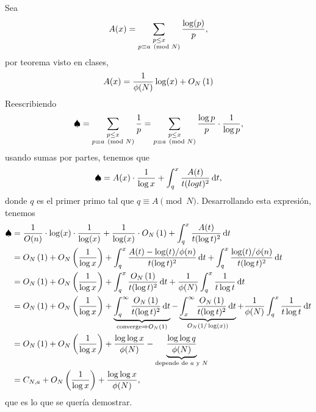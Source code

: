 \begin{sol}
	Sea
	$$A(x) = \ds\sum_{\substack{p \leq x \\ p \equiv a \pmod N}} \frac{\log (p)}{p},$$
	por teorema visto en clases,
	$$A(x) = \frac{1}{\phi(N)} \log (x) + \BigO[N]{1}$$
	Reescribiendo
	$$\spadesuit = \ds\sum_{\substack{p \leq x \\ p \equiv a \pmod N}} \frac{1}{p} = \ds\sum_{\substack{p \leq x \\ p \equiv a \pmod N}} \frac{\log p}{p} \cdot \frac{1}{\log p},$$
	usando sumas por partes, tenemos que
	$$\spadesuit = A(x) \cdot \frac{1}{\log x} + \int_q^x \frac{A(t)}{t (log t)^2} \d{t},$$
	donde $q$ es el primer primo tal que $q \equiv A \pmod N$. Desarrollando esta expresión, tenemos
	\begin{align*}
		\spadesuit & = \frac{1}{O(n)} \cdot \log (x) \cdot \frac{1}{\log (x)} + \frac{1}{\log (x)} \cdot \BigO[N]{1} + \int_q^x \frac{A(t)}{t (\log t)^2} \d{t}                                                                                                                                                             \\
		           & = \BigO[N]{1} + \BigO[N]{ \frac{1}{\log x} } + \int_q^x \frac{A(t) - \log(t)/\phi(n)}{t (\log t)^2} \d{t} + \int_q^x \frac{\log(t)/\phi(n)}{t (\log t)^2} \d{t}                                                                                                                                        \\
		           & = \BigO[N]{1} + \BigO[N]{ \frac{1}{\log x} } + \int_q^x \frac{\BigO[N]{1}}{t (\log t)^2} \d{t} + \frac{1}{\phi(N)} \int_q^x \frac{1}{t \log t} \d{t}                                                                                                                                                   \\
		           & = \BigO[N]{1} + \BigO[N]{ \frac{1}{\log x} } + \underbrace{\int_q^\infty \frac{\BigO[N]{1}}{t (\log t)^2} \d{t}}_{\text{converge} \Rightarrow \BigO[N]{1}} - \underbrace{\int_x^\infty \frac{\BigO[N]{1}}{t (\log t)^2} \d{t}}_{O_N(1/\log (x))} + \frac{1}{\phi(N)} \int_q^x \frac{1}{t \log t} \d{t} \\
		           & = \BigO[N]{1} + \BigO[N]{ \frac{1}{\log x} } + \frac{\log \log x}{\phi (N)}  - \underbrace{\frac{\log \log q}{\phi (N)}}_{\text{depende de } a \text{ y } N}                                                                                                                                           \\
		           & = C_{N, a} + \BigO[N]{ \frac{1}{\log x} } + \frac{\log \log x}{\phi(N)},
	\end{align*}
	que es lo que se quería demostrar.
\end{sol}


